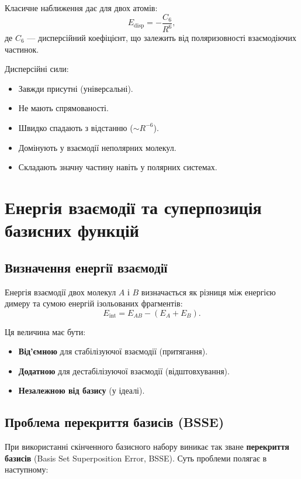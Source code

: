 Класичне наближення дає для двох атомів:
\[
E_{\text{disp}} = -\frac{C_6}{R^6},
\]
де \(C_6\) --- дисперсійний коефіцієнт, що залежить від поляризовності взаємодіючих частинок.

Дисперсійні сили:
\begin{itemize}
    \item Завжди присутні (універсальні).
    \item Не мають спрямованості.
    \item Швидко спадають з відстанню (\(\sim R^{-6}\)).
    \item Домінують у взаємодії неполярних молекул.
    \item Складають значну частину навіть у полярних системах.
\end{itemize}

\section{Енергія взаємодії та суперпозиція базисних функцій}

\subsection{Визначення енергії взаємодії}

Енергія взаємодії двох молекул \( A \) і \( B \) визначається як різниця між енергією димеру та сумою енергій ізольованих фрагментів:
\[
E_{\text{int}} = E_{AB} - (E_A + E_B).
\]

Ця величина має бути:
\begin{itemize}
    \item \textbf{Від'ємною} для стабілізуючої взаємодії (притягання).
    \item \textbf{Додатною} для дестабілізуючої взаємодії (відштовхування).
    \item \textbf{Незалежною від базису} (у ідеалі).
\end{itemize}

\subsection{Проблема перекриття базисів (BSSE)}

При використанні скінченного базисного набору виникає так зване \textbf{перекриття базисів} (Basis Set Superposition Error, BSSE). Суть проблеми полягає в наступному:

